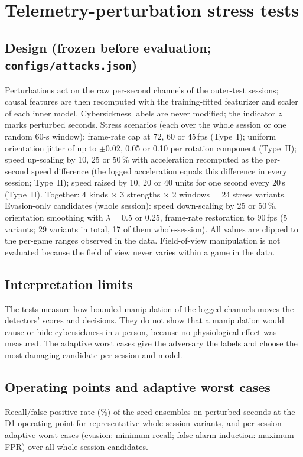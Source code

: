 \section{Telemetry-perturbation stress tests}
\label{sec:s-attacks}

\subsection{Design (frozen before evaluation; \texttt{configs/\allowbreak attacks.json})}
Perturbations act on the raw per-second channels of the outer-test sessions; causal features are then recomputed with the training-fitted featurizer and scaler of each inner model. Cybersickness labels are never modified; the indicator $z$ marks perturbed seconds. Stress scenarios (each over the whole session or one random 60-s window): frame-rate cap at 72, 60 or 45\,fps (Type~I); uniform orientation jitter of up to $\pm$0.02, 0.05 or 0.10 per rotation component (Type~II); speed up-scaling by 10, 25 or 50\,\% with acceleration recomputed as the per-second speed difference (the logged acceleration equals this difference in every session; Type~II); speed raised by 10, 20 or 40 units for one second every 20\,s (Type~II). Together: 4 kinds $\times$ 3 strengths $\times$ 2 windows = 24 stress variants. Evasion-only candidates (whole session): speed down-scaling by 25 or 50\,\%, orientation smoothing with $\lambda=0.5$ or 0.25, frame-rate restoration to 90\,fps (5 variants; 29 variants in total, 17 of them whole-session). All values are clipped to the per-game ranges observed in the data. Field-of-view manipulation is not evaluated because the field of view never varies within a game in the data.

\subsection{Interpretation limits}
The tests measure how bounded manipulation of the logged channels moves the detectors' scores and decisions. They do not show that a manipulation would cause or hide cybersickness in a person, because no physiological effect was measured. The adaptive worst cases give the adversary the labels and choose the most damaging candidate per session and model.

\subsection{Operating points and adaptive worst cases}
Recall/false-positive rate (\%) of the seed ensembles on perturbed seconds at the D1 operating point for representative whole-session variants, and per-session adaptive worst cases (evasion: minimum recall; false-alarm induction: maximum FPR) over all \AttAucNVariants{} whole-session candidates.

